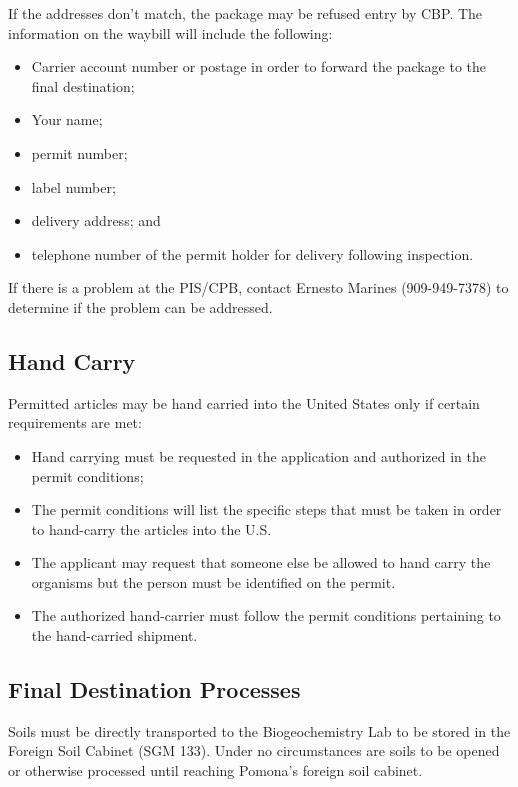\documentclass[12pt]{../SOP3}\usepackage[]{graphicx}\usepackage[]{color}
\begin{document}
\NP If the addresses don't match, the package may be refused entry by CBP. The information on the waybill will include the following: 

\begin{itemize}
\item Carrier account number or postage in order to forward the package to the final destination; 
\item Your name;
\item permit number; 
\item label number; 
\item delivery address; and 
\item telephone number of the permit holder for delivery following inspection.
\end{itemize}

\NP If there is a problem at the PIS/CPB, contact Ernesto Marines (909-949-7378) to determine if the problem can be addressed. 

\subsection{Hand Carry}

\NP Permitted articles may be hand carried into the United States only if certain requirements are met: 

\begin{itemize}
  \item Hand carrying must be requested in the application and authorized in the permit conditions;
  \item The permit conditions will list the specific steps that must be taken in order to hand-carry the articles into the U.S. 
  \item The applicant may request that someone else be allowed to hand carry the organisms but the person must be identified on the permit.
  \item The authorized hand-carrier must follow the permit conditions pertaining to the hand-carried shipment.
\end{itemize}

\subsection{Final Destination Processes}

\NP Soils must be directly transported to the Biogeochemistry Lab to be stored in the Foreign Soil Cabinet (SGM 133). Under no circumstances are soils to be opened or otherwise processed until reaching Pomona's foreign soil cabinet. 
\end{document}
